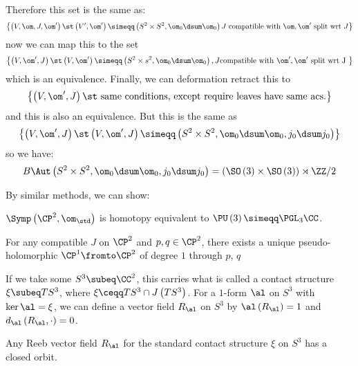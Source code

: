 \documentclass{amsart}
\begin{document}
Therefore this set is the same as:
\begin{equation}
\left\{ \left( V , \om , J , \om' \right)\st
\left( V' , \om' \right) \simeqq \left( S^2 \times S^2 , \om_0 \dsum \om_0 \right)
J \text{ compatible with } \om,
\om'\text{ split wrt }J\right\}
\end{equation}
now we can map this to the set
\begin{equation}
\left\{ \left( V , \om' , J \right) \st
\left( V , \om' \right)\simeqq \left( S^2 \times s^2 , \om_0 \dsum \om_0 \right) , 
J\text{compatible with } \om' , 
\om' \text{ split wrt J }\right\}
\end{equation}
which is an equivalence. 
Finally, we can deformation retract this to
\begin{equation}
\left\{ \left( V , \om' , J \right) \st
\text{ same conditions, except require leaves have same acs.}\right\}
\end{equation}
and this is also an equivalence. But this is the same as
\begin{equation}
\left\{ \left( V, \om' , J \right) \st
\left( V , \om' , J \right) \simeqq
\left( S^2 \times S^2, \om_0 \dsum \om_0 , j_0 \dsum j_0 \right)\right\}
\end{equation}
so we have:
\begin{equation}
B\Aut\left( S^2 \times S^2 , \om_0 \dsum \om_0 , j_0 \dsum j_0\right)
= \left( \SO\left( 3 \right) \times \SO\left( 3 \right) \right)\rtimes \ZZ / 2
\end{equation}

By similar methods, we can show:

\begin{thm}
$\Symp\left( \CP^2 , \om_\std \right)$ is homotopy equivalent to
$\PU\left( 3 \right) \simeqq \PGL_3\CC$.
\end{thm}

\begin{prop}
For any compatible $J$ on $\CP^2$ and $p,q\in \CP^2$, 
there exists a unique pseudo-holomorphic $\CP^1 \fromto \CP^2$ of degree $1$ through $p$, $q$
\end{prop}

If we take some $S^3 \subeq \CC^2$, this carries what is called a contact structure
$\xi\subeq TS^3$, where
$\xi \ceqq TS^3 \cap J\left( TS^3 \right)$.
For a $1$-form $\al$ on $S^3$ with $\ker \al= \xi$, 
we can define a vector field $R_\al$ on $S^3$ by
$\al\left( R_\al \right) = 1$ and $d_\al\left( R_\al , \cdot \right) = 0$.

\begin{cor}
Any Reeb vector field $R_\al$ for the standard contact structure $\xi$
on $S^3$ has a closed orbit. 
\end{cor}
\end{document}

